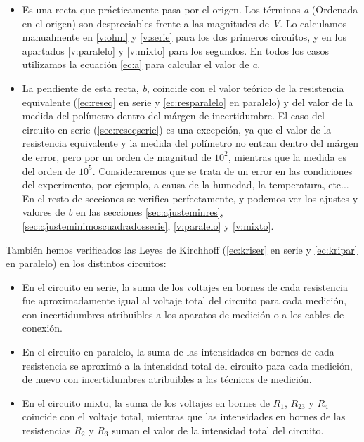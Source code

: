 \documentclass[12pt, a4paper, titlepage]{article}
\begin{document}
  \begin{itemize}[label=$-$]
    \item Es una recta que prácticamente pasa por el origen. Los términos \textit{a} (Ordenada en el origen) son despreciables frente a las magnitudes de \textit{V}. Lo calculamos manualmente en \ref{v:ohm} y \ref{v:serie} para los dos primeros circuitos, y en los apartados \ref{v:paralelo} y \ref{v:mixto} para los segundos. En todos los casos utilizamos la ecuación \ref{ec:a} para calcular el valor de \textit{a}.
    \item La pendiente de esta recta, \textit{b}, coincide con el valor teórico de la resistencia equivalente (\ref{ec:reseq} en serie y \ref{ec:resparalelo} en paralelo) y del valor de la medida del polímetro dentro del márgen de incertidumbre. El caso del circuito en serie (\ref{sec:reseqserie}) es una excepción, ya que el valor de la resistencia equivalente y la medida del polímetro no entran dentro del márgen de error, pero por un orden de magnitud de $10^2$, mientras que la medida es del orden de $10^5$. Consideraremos que se trata de un error en las condiciones del experimento, por ejemplo, a causa de la humedad, la temperatura, etc... En el resto de secciones se verifica perfectamente, y podemos ver los ajustes y valores de \textit{b} en las secciones \ref{sec:ajusteminres}, \ref{sec:ajusteminimoscuadradosserie}, \ref{v:paralelo} y \ref{v:mixto}.
  \end{itemize}

  También hemos verificados las Leyes de Kirchhoff (\ref{ec:kriser} en serie y \ref{ec:kripar} en paralelo) en los distintos circuitos:

  \begin{itemize}[label=$-$]
    \item En el circuito en serie, la suma de los voltajes en bornes de cada resistencia fue aproximadamente igual al voltaje total del circuito para cada medición, con incertidumbres atribuibles a los aparatos de medición o a los cables de conexión.
    \item En el circuito en paralelo, la suma de las intensidades en bornes de cada resistencia se aproximó a la intensidad total del circuito para cada medición, de nuevo con incertidumbres atribuibles a las técnicas de medición.
    \item En el circuito mixto, la suma de los voltajes en bornes de $R_1$, $R_{23}$ y $R_4$ coincide con el voltaje total, mientras que las intensidades en bornes de las resistencias $R_2$ y $R_3$ suman el valor de la intensidad total del circuito.
  \end{itemize}
\end{document}
